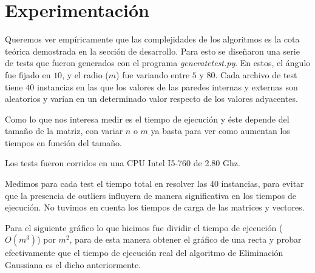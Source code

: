 \section{Experimentación}

Queremos ver empíricamente que las complejidades de los algoritmos es la cota teórica demostrada en la sección de desarrollo. Para esto se diseñaron una serie de tests que fueron generados con el programa \textit{generatetest.py}. En estos, el ángulo fue fijado en $10$, y el radio ($m$) fue variando entre $5$ y $80$.
Cada archivo de test tiene $40$ instancias en las que los valores de las paredes internas y externas son aleatorios y varían en un determinado valor respecto de los valores adyacentes.

Como lo que nos interesa medir es el tiempo de ejecución y éste depende del tamaño de la matriz, con variar $n$ o $m$ ya basta para ver como aumentan los tiempos en función del tamaño.

Los tests fueron corridos en una CPU Intel I5-760 de 2.80 Ghz.

Medimos para cada test el tiempo total en resolver las 40 instancias, para evitar que la presencia de outliers influyera de manera significativa en los tiempos de ejecución. No tuvimos en cuenta los tiempos de carga de las matrices y vectores.

Para el siguiente gráfico lo que hicimos fue dividir el tiempo de ejecución ($O(m^{3})$) por $m^{2}$, para de esta manera obtener el gráfico de una recta y probar efectivamente que el tiempo de ejecución real del algoritmo de Eliminación Gaussiana es el dicho anteriormente.

